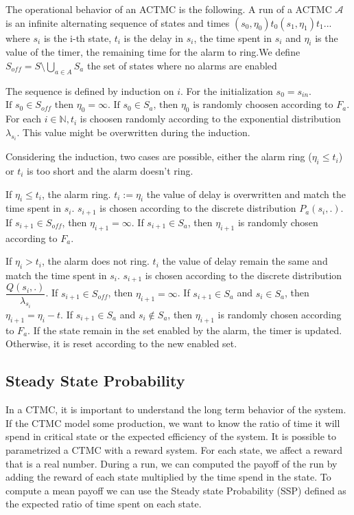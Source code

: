 The operational behavior of an ACTMC is the following. A run of a ACTMC $\mathcal{A}$ is an infinite alternating sequence of states and times $(s_0,\eta_0)t_0(s_1,\eta_1)t_1...$ where 
$s_i$ is the i-th state, 
$t_i$ is the delay in $s_i$, the time spent in $s_i$ and 
$\eta_i$ is the value of the timer, the remaining time for the alarm to ring.We define $S_{off} = S\setminus\bigcup_{a \in A} S_a$ the set of states where no alarms are enabled

The sequence is defined by induction on $i$. For the initialization $s_0 = s_{in}$. $\text{If } s_0 \in S_{off} \text{ then } \eta_0 =\infty \text{. If } s_0 \in S_{a}\text{, then } \eta_0 \text{ is randomly choosen according to }F_a$. For each $i \in \mathbb{N}, t_i$ is choosen randomly according to the exponential distribution $\lambda_{s_i}$. This value might be overwritten during the induction.

Considering the induction, two cases are possible, either the alarm ring ($\eta_i \leq t_i$) or $t_i$ is too short and the alarm doesn't ring.

If $\eta_i \leq t_i$, the alarm ring. 
$t_i := \eta_i$ the value of delay is overwritten and match the time spent in $s_i$. 
$s_{i+1}$ is chosen according to the discrete distribution $P_a(s_i,.)$. 
If $s_{i+1} \in S_{off}$, then $\eta_{i+1} =\infty$. 
If $s_{i+1} \in S_{a}$, then $\eta_{i+1}$ is randomly chosen according to $F_a$.

If $\eta_i > t_i$, the alarm does not ring. 
$t_i$ the value of delay remain the same and match the time spent in $s_i$.
$s_{i+1}$ is chosen according to the discrete distribution $\dfrac{Q(s_i,.)}{\lambda_{s_i}}$.
If $s_{i+1} \in S_{off}$, then  $\eta_{i+1} = \infty$.
If $s_{i+1} \in S_{a}$ and $s_{i} \in S_{a}$, then  $\eta_{i+1} =\eta_i - t$.
If $s_{i+1} \in S_{a}$ and $s_{i} \notin S_{a}$, then
$\eta_{i+1}$ is randomly chosen according to $F_a$. 
If the state remain in the set enabled by the alarm, the timer is updated. Otherwise, it is reset according to the new enabled set.

\subsection{Steady State Probability}
In a CTMC, it is important to understand the long term behavior of the system. If the CTMC model some production, we want to know the ratio of time it will spend in critical state or the expected efficiency of the system. It is possible to parametrized a CTMC with a reward system. For each state, we affect a reward that is a real number. During a run, we can computed the payoff of the run by adding the reward of each state multiplied by the time spend in the state. To compute a mean payoff we can use the Steady state Probability (SSP) defined as the expected ratio  of time spent on each state.

